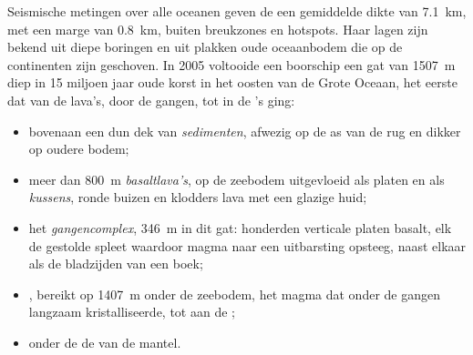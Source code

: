 Seismische metingen over alle oceanen geven de  een gemiddelde
dikte van \qty{7.1}{km}, met een marge van \qty{0.8}{km}, buiten breukzones en
hotspots. Haar lagen zijn bekend uit diepe boringen en uit plakken oude oceaanbodem
die op de continenten zijn geschoven. In 2005 voltooide een boorschip een gat van
\qty{1507}{m} diep in 15 miljoen jaar oude korst in het oosten van de Grote
Oceaan, het eerste dat van de lava's, door de gangen, tot in de
's ging:

\begin{itemize}
  \item bovenaan een dun dek van \emph{sedimenten}, afwezig op de as van de
        rug en dikker op oudere bodem;
  \item meer dan \qty{800}{m} \emph{basaltlava's}, op de zeebodem uitgevloeid
        als platen en als \emph{kussens}, ronde buizen en klodders
        lava met een glazige huid;
  \item het \emph{gangencomplex}, \qty{346}{m} in dit gat: honderden
        verticale platen basalt, elk de gestolde spleet waardoor magma
        naar een uitbarsting opsteeg, naast elkaar als de bladzijden van een boek;
  \item \emph{}, bereikt op \qty{1407}{m} onder de zeebodem, het magma
        dat onder de gangen langzaam kristalliseerde, tot aan de ;
  \item onder de  de \emph{} van de mantel.
\end{itemize}

